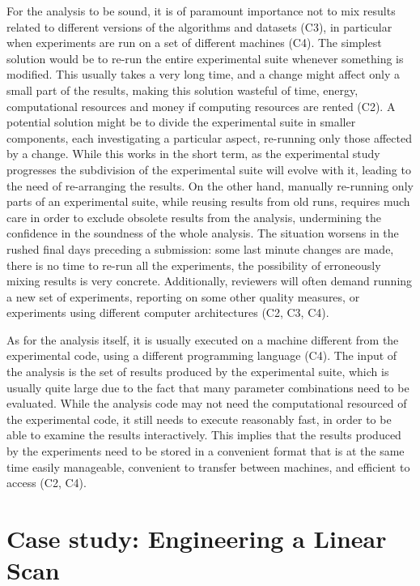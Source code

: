 \documentclass{llncs}
\begin{document}
For the analysis to be sound, it is of paramount importance not to 
mix results related to different versions
of the algorithms and datasets (C3), in particular when experiments are run on a set of different machines (C4). 
The simplest solution would be to re-run the entire experimental suite whenever
something is modified. 
This usually takes a very long time, and a change might affect 
only a small part of the results, making this solution wasteful of time, energy, computational resources and money if computing resources are rented (C2). 
A potential solution might be to divide the experimental suite in smaller
components, each investigating a particular aspect, re-running only those 
affected by a change.
While this works in the short term, as the experimental study progresses
the subdivision of the experimental suite will evolve with it, leading to the
need of re-arranging the results.
On the other hand, manually re-running only parts of an experimental suite,
while reusing results from old runs, requires much care in order to exclude
obsolete results from the analysis, undermining the confidence in the soundness
of the whole analysis.
The situation worsens in the rushed final days preceding a submission:
some last minute changes are made, there is no time to re-run all the experiments,
the possibility of erroneously mixing results is very concrete. Additionally, reviewers will often demand running a new set of experiments, reporting on some other quality measures, or experiments using different computer architectures (C2, C3, C4).

As for the analysis itself, it is usually executed on a machine different from the
experimental code, using a different programming language (C4).
The input of the analysis is the set of results produced by the experimental suite,
which is usually quite large due to the fact that many parameter combinations
need to be evaluated.
While the analysis code may not need the computational resourced of the 
experimental code, it still needs to execute reasonably fast, in order to be able
to examine the results interactively.
This implies that the results produced by the experiments need to be 
stored in a convenient
format that is at the same time easily manageable, convenient to transfer between
machines, and efficient to access (C2, C4).



\section{Case study: Engineering a Linear Scan}
\end{document}
